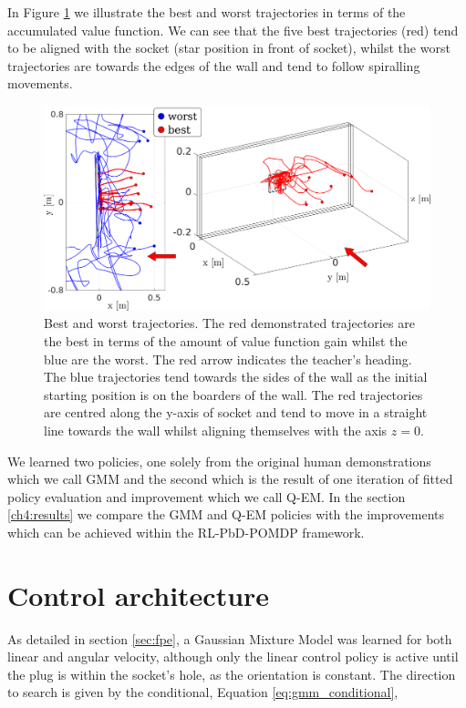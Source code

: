 \documentclass[final,3p,times,twocolumn]{elsarticle}
\begin{document}
In Figure \ref{fig:best_worst_traj} we illustrate the best and worst trajectories in terms of the accumulated value function.
We can see that the five best trajectories (red) tend to be aligned with the socket (star position in front of socket), 
whilst the worst trajectories are towards the edges of the wall and tend to follow spiralling movements. 

\begin{figure}
 \centering
 \includegraphics[width=\textwidth]{./Figures/ValueFunction/value_func_final_v3.pdf}
 \caption{Best and worst trajectories. The red demonstrated trajectories are the best in terms of the amount of value function 
 gain whilst the blue are the worst. The red arrow indicates the teacher's heading. The blue trajectories tend 
 towards the sides of the wall as the initial starting position is on the boarders of the wall. The red trajectories are centred along the y-axis of socket and tend to move in a straight line towards 
 the wall whilst aligning themselves with the axis $z=0$.} 
 \label{fig:best_worst_traj}
\end{figure}


We learned two policies, one solely from the original human demonstrations which we call GMM and the second which 
is the result of one iteration of fitted policy evaluation and improvement which we call Q-EM. In the section \ref{ch4:results}
we compare the GMM and Q-EM policies with the improvements which can be achieved within the RL-PbD-POMDP framework.

\section{Control architecture}\label{ch4:control_architecture}

As detailed in section \ref{sec:fpe}, a Gaussian Mixture Model was learned for both linear and angular velocity,
although only the linear control policy is active until the plug is within 
the socket's hole, as the orientation is constant.
The direction to search is given by the conditional, Equation \ref{eq:gmm_conditional},
\end{document}
